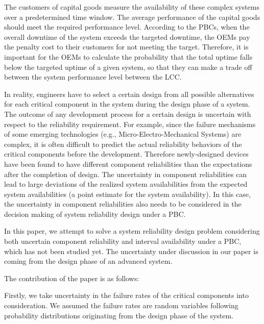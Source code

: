 \documentclass[preprint,12pt]{elsarticle}
\begin{document}

The customers of capital goods measure the availability of these complex systems over a predetermined time window. The average performance of the capital goods should meet the required performance level. According to the PBCs, when the overall downtime of the system exceeds the targeted downtime, the OEMs pay the penalty cost to their customers for not meeting the target. Therefore, it is important for the OEMs to calculate the probability that the total uptime falls below the targeted uptime of a given system, so that they can make a trade off between the system performance level between the LCC.


In reality, engineers have to select a certain design from all possible alternatives for each critical component in the system during the design phase of a system. The outcome of any development process for a certain design is uncertain with respect to the reliability requirement. For example, since the failure mechanisms of some emerging technologies (e.g., Micro-Electro-Mechanical Systems) are complex, it is often difficult to predict the actual reliability behaviors of the critical components before the development. Therefore newly-designed devices have been found to have different component reliabilities than the expectations after the completion of design. The uncertainty in component reliabilities can lead to large deviations of the realized system availabilities from the expected system availabilities (a point estimate for the system availability). In this case, the uncertainty in component reliabilities also needs to be considered in the decision making of system reliability design under a PBC.

In this paper, we attempt to solve a system reliability design problem considering both uncertain component reliability and interval availability under a PBC, which has not been studied yet. The uncertainty under discussion in our paper is coming from the design phase of an advanced system.

The contribution of the paper is as follows:

Firstly, we take uncertainty in the failure rates of the critical components into consideration. We assumed the failure rates are random variables following probability distributions originating from the design phase of the system.
\end{document}
